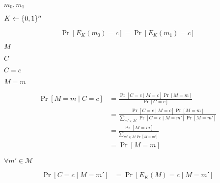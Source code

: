 \documentclass[10pt]{book}
\begin{document}
\begin{mdSnippets}
\begin{mdInlineSnippet}[0b02be2105e9778833fb7fbd15244683]%
$m_0,m_1$\end{mdInlineSnippet}%
\begin{mdInlineSnippet}%
$K \gets \{0,1\}^{n}$\end{mdInlineSnippet}%
\begin{mdDisplaySnippet}%
\[%
\Pr[E_K(m_0) = c] = \Pr[E_K(m_1) = c] 
\]%
\end{mdDisplaySnippet}%
\begin{mdInlineSnippet}[69691c7bdcc3ce6d5d8a1361f22d04ac]%
$M$\end{mdInlineSnippet}%
\begin{mdInlineSnippet}[0d61f8370cad1d412f80b84d143e1257]%
$C$\end{mdInlineSnippet}%
\begin{mdInlineSnippet}[2fb292db54be37453ab787b11c588115]%
$C = c$\end{mdInlineSnippet}%
\begin{mdInlineSnippet}[36e5b77de21275ba24668f3447aac8ab]%
$M = m$\end{mdInlineSnippet}%
\begin{mdDisplaySnippet}[9367600c741615cacd8ae807a44f6236]%
\[%
\begin{aligned}
\Pr[M = m \mid C = c] &= \frac{\Pr[C = c \mid M = c] \Pr[M = m]}{\Pr[C = c]} \\
&= \frac{\Pr[C = c \mid M = c] \Pr[M = m]}{\sum_{m' \in \mathcal{M}} \Pr[C = c \mid M = m'] \Pr[M = m']} \\
&= \frac{\Pr[M = m]}{\sum_{m' \in \mathcal{M} \Pr[M = m']}} \\
&= \Pr[M = m]
\end{aligned}
\]%
\end{mdDisplaySnippet}%
\begin{mdInlineSnippet}[9dd9e7c398cdf5be1f188076b81d414c]%
$\forall m' \in \mathcal{M}$\end{mdInlineSnippet}%
\begin{mdDisplaySnippet}%
\[%
\begin{aligned}
\Pr[C = c \mid M = m'] &= \Pr[E_K(M) = c \mid M = m'] \\

\end{aligned}\]
\end{mdDisplaySnippet}
\end{mdSnippets}
\end{document}
